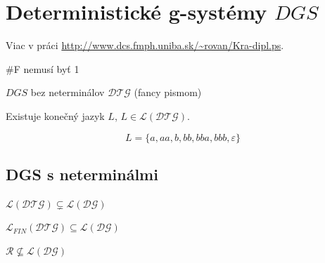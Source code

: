 \section{Deterministické g-systémy $DGS$}
\begin{poznamka}
Viac v práci \url{http://www.dcs.fmph.uniba.sk/~rovan/Kra-dipl.ps}.
\end{poznamka}

\#F nemusí byť 1

$DGS$ bez neterminálov $\mathcal{DTG}$ (fancy pismom)
 
\begin{veta}
Existuje konečný jazyk $L$, $L \in \mathcal{L}(\mathcal{DTG})$.
\end{veta}
\begin{dokaz}
$$L = \{a, aa, b, bb, bba, bbb, \varepsilon\}$$
\end{dokaz}

\subsection{DGS s neterminálmi}
\begin{veta}
$\mathcal{L}(\mathcal{DTG}) \subsetneq \mathcal{L}(\mathcal{DG})$
\end{veta}
\begin{veta}
$\mathcal{L}_{FIN}(\mathcal{DTG}) \subseteq \mathcal{L}(\mathcal{DG})$
\end{veta}
$\mathcal{R} \not\subseteq  \mathcal{L}(\mathcal{DG})$

